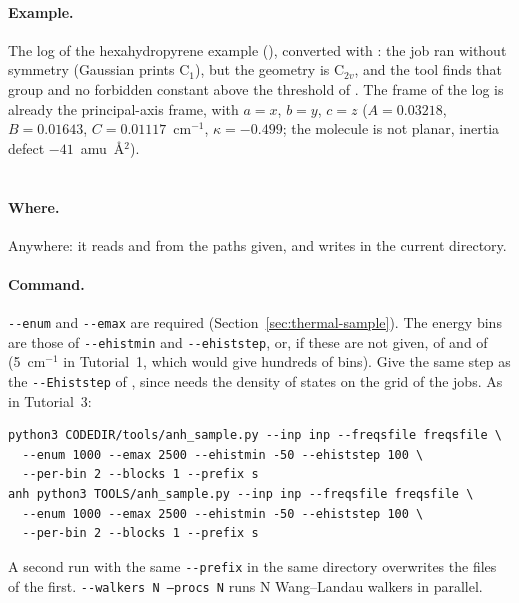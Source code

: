 \paragraph{Example.} The log of the hexahydropyrene example
(), converted with :
the job ran without symmetry (Gaussian prints C$_1$), but the geometry is
C$_{2v}$, and the tool finds that group and no forbidden constant above
the threshold of . The frame of the log is already
the principal-axis frame, with $a = x$, $b = y$, $c = z$
($A = 0.03218$, $B = 0.01643$, $C = 0.01117$~cm$^{-1}$, $\kappa = -0.499$;
the molecule is not planar, inertia defect $-41$~amu~\AA$^2$).

\section{}\label{sec:run-sample}

\paragraph{Where.} Anywhere: it reads  and 
from the paths given, and writes in the current directory.

\paragraph{Command.} \texttt{-{}-enum} and \texttt{-{}-emax} are required
(Section~\ref{sec:thermal-sample}). The energy bins are those of
\texttt{-{}-ehistmin} and \texttt{-{}-ehiststep}, or, if these are not given,
of  and  of  (5~cm$^{-1}$ in
Tutorial~1, which would give hundreds of bins). Give the same step as the
\texttt{-{}-Ehiststep} of , since 
needs the density of states on the grid of the jobs. As in Tutorial~3:
\begin{lstlisting}
python3 CODEDIR/tools/anh_sample.py --inp inp --freqsfile freqsfile \
  --enum 1000 --emax 2500 --ehistmin -50 --ehiststep 100 \
  --per-bin 2 --blocks 1 --prefix s
anh python3 TOOLS/anh_sample.py --inp inp --freqsfile freqsfile \
  --enum 1000 --emax 2500 --ehistmin -50 --ehiststep 100 \
  --per-bin 2 --blocks 1 --prefix s
\end{lstlisting}
A second run with the same \texttt{-{}-prefix} in the same directory
overwrites the files of the first.
\texttt{-{}-walkers N --procs N} runs N Wang--Landau walkers in parallel.

